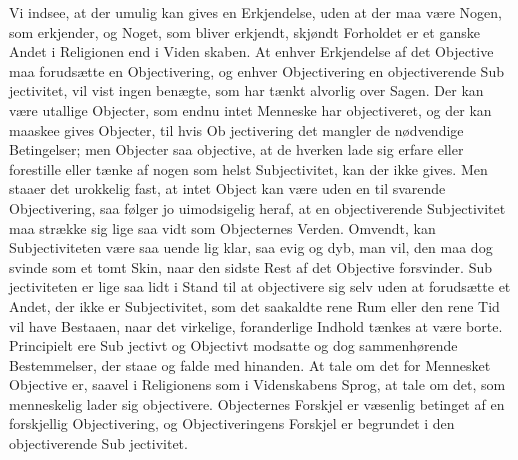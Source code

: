 \documentclass[12pt,a4paper]{article}
\begin{document}
Vi indsee, at der umulig kan gives en Erkjendelse, uden at
der maa være Nogen, som erkjender, og Noget, som bliver erkjendt,
skjøndt Forholdet er et ganske Andet i Religionen end i Viden\-%
skaben. At enhver Erkjendelse af det Objective maa forudsætte
en Objectivering, og enhver Objectivering en objectiverende Sub\-%
jectivitet, vil vist ingen benægte, som har tænkt alvorlig over
Sagen. Der kan være utallige Objecter, som endnu intet Menneske
har objectiveret, og der kan maaskee gives Objecter, til hvis Ob\-%
jectivering det mangler de nødvendige Betingelser; men Objecter
saa objective, at de hverken lade sig erfare eller forestille eller
tænke af nogen som helst Subjectivitet, kan der ikke gives. Men
staaer det urokkelig fast, at intet Object kan være uden en til\-%
svarende Objectivering, saa følger jo uimodsigelig heraf, at en
objectiverende Subjectivitet maa strække sig lige saa vidt som
Objecternes Verden. Omvendt, kan Subjectiviteten være saa uende\-%
lig klar, saa evig og dyb, man vil, den maa dog svinde som et
tomt Skin, naar den sidste Rest af det Objective forsvinder. Sub\-%
jectiviteten er lige saa lidt i Stand til at objectivere sig selv uden
at forudsætte et Andet, der ikke er Subjectivitet, som det saakaldte
rene Rum eller den rene Tid vil have Bestaaen, naar det virkelige,
foranderlige Indhold tænkes at være borte. Principielt ere Sub\-%
jectivt og Objectivt modsatte og dog sammenhørende Bestemmelser,
der staae og falde med hinanden. At tale om det for Mennesket
Objective er, saavel i Religionens som i Videnskabens Sprog, at
tale om det, som menneskelig lader sig objectivere. Objecternes
Forskjel er væsenlig betinget af en forskjellig Objectivering, og
Objectiveringens Forskjel er begrundet i den objectiverende Sub\-%
jectivitet.
\end{document}
